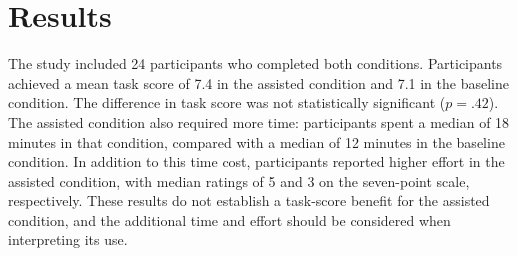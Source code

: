 \section{Results}\label{sec:results}
The study included 24 participants who completed both conditions. Participants achieved a mean task score of 7.4 in the assisted condition and 7.1 in the baseline condition. The difference in task score was not statistically significant ($p=.42$). The assisted condition also required more time: participants spent a median of 18 minutes in that condition, compared with a median of 12 minutes in the baseline condition. In addition to this time cost, participants reported higher effort in the assisted condition, with median ratings of 5 and 3 on the seven-point scale, respectively. These results do not establish a task-score benefit for the assisted condition, and the additional time and effort should be considered when interpreting its use.
